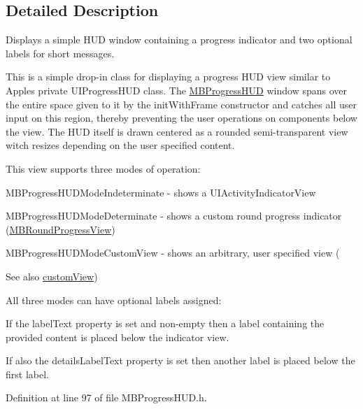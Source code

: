 \subsection{Detailed Description}
Displays a simple HUD window containing a progress indicator and two optional labels for short messages.

This is a simple drop-\/in class for displaying a progress HUD view similar to Apples private UIProgressHUD class. The \hyperlink{interface_m_b_progress_h_u_d}{MBProgressHUD} window spans over the entire space given to it by the initWithFrame constructor and catches all user input on this region, thereby preventing the user operations on components below the view. The HUD itself is drawn centered as a rounded semi-\/transparent view witch resizes depending on the user specified content.

This view supports three modes of operation:
\begin{DoxyItemize}
\item MBProgressHUDModeIndeterminate -\/ shows a UIActivityIndicatorView
\item MBProgressHUDModeDeterminate -\/ shows a custom round progress indicator (\hyperlink{interface_m_b_round_progress_view}{MBRoundProgressView})
\item MBProgressHUDModeCustomView -\/ shows an arbitrary, user specified view (\begin{DoxySeeAlso}{See also}
\hyperlink{interface_m_b_progress_h_u_d_a3a6f62a10481ff864c43768214335413}{customView})
\end{DoxySeeAlso}
All three modes can have optional labels assigned:
\item If the labelText property is set and non-\/empty then a label containing the provided content is placed below the indicator view.
\item If also the detailsLabelText property is set then another label is placed below the first label. 
\end{DoxyItemize}

Definition at line 97 of file MBProgressHUD.h.



